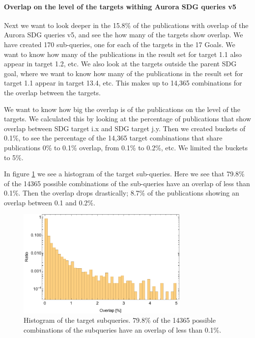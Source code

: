 \documentclass{article}
\begin{document}
\paragraph{Overlap on the level of the targets withing Aurora SDG queries v5}
Next we want to look deeper in the 15.8\% of the publications with overlap of the Aurora SDG queries v5, and see the how many of the targets show overlap. We have created 170 sub-queries, one for each of the targets in the 17 Goals. We want to know how many of the publications in the result set for target 1.1 also appear in target 1.2, etc. We also look at the targets outside the parent SDG goal, where we want to know how many of the publications in the result set for target 1.1 appear in target 13.4, etc. This makes up to 14,365 combinations for the overlap between the targets.

We want to know how big the overlap is of the publications on the level of the targets. We calculated this by looking at the percentage of publications that show overlap between SDG target i.x and SDG target j.y. Then we created buckets of 0.1\%, to see the percentage of the 14,365 target combinations that share publications 0\% to 0.1\% overlap, from 0.1\% to 0.2\%, etc. We limited the buckets to 5\%.

In figure \ref{subquerieshistogram} we see a histogram of the target sub-queries. Here we see that 79.8\% of the 14365 possible combinations of the sub-queries have an overlap of less than 0.1\%. Then the overlap drops drastically; 8.7\% of the publications showing an overlap between 0.1 and 0.2\%.

\begin{figure}[H]
	\centering
  \includegraphics[width=0.75\textwidth]{figures/subqueryhistogram.pdf}
	\caption{Histogram of the target subqueries. 79.8\% of the 14365 possible combinations of the subqueries have an overlap of less than 0.1\%.}
	\label{subquerieshistogram}
\end{figure}
\end{document}
